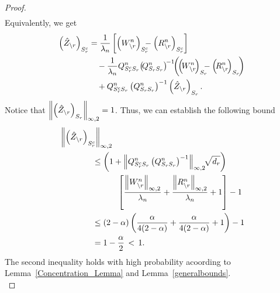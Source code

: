 \begin{proof}
\begin{equation}
\begin{aligned}
\end{aligned}
\nonumber
\end{equation}
Equivalently, we get
\begin{equation}
\begin{aligned}
\left(\hat{\dual}_{\backslash\svert}\right)_{\support_\svert^c} &= \frac{1}{\regpar_n}\left[\left(W_{\backslash\svert}^n\right)_{\support_\svert^c} \!\!\!\!-\left(R_{\backslash\svert}^n\right)_{\support_\svert^c}\right]\\ &\quad-\frac{1}{\regpar_n}\fisher^n_{\support_\svert^c\support_\svert}\! \left(\!\fisher^n_{\support_\svert\support_\svert}\right)^{\!-1} \!\!\left(\!\left(\!W_{\backslash\svert}^n\!\right)_{\support_\svert} \!\!\!\!-\left(\!R_{\backslash\svert}^n\!\right)_{\support_\svert}\!\right)\\ &\quad+\fisher^n_{\support_\svert^c\support_\svert} \left(\fisher^n_{\support_\svert\support_\svert}\right)^{-1} \left(\hat{\dual}_{\backslash\svert}\right)_{\support_\svert}.\\
\end{aligned} 
\nonumber
\end{equation}
Notice that $\left\|\left(\hat{Z}_{\backslash r}\right)_{S_{r}}\right\|_{\infty,2}=1$. Thus, we can establish the following bound
\begin{equation}
\begin{aligned}
&\left\|\left(\hat{Z}_{\backslash r}\right)_{S_{r}^c}\right\|_{\infty,2}\\ &\qquad\qquad\leq \left(1+\left\|Q^n_{S_{r}^cS_{r}} \left(Q^n_{S_{r}S_{r}}\right)^{-1}\right\|_{\infty,2}\!\!\sqrt{d_{r}}\right)\\ &\qquad\qquad\qquad\quad\left[\frac{\left\|W_{\backslash r}^n\right\|_{\infty,2}}{\lambda_n} +\frac{\left\|R_{\backslash r}^n\right\|_{\infty,2}}{\lambda_n}+1\right]-1\\
&\qquad\qquad\leq(2-\alpha)\left(\frac{\alpha}{4(2-\alpha)}+\frac{\alpha}{4(2-\alpha)}+1\right)-1\\ &\qquad\qquad= 1-\frac{\alpha}{2} \,<\, 1.
\end{aligned}
\nonumber
\end{equation}
The second inequality holds with high probability acoording to Lemma~\ref{Concentration_Lemma} and Lemma~\ref{generalbounds}.\\
\end{proof}

